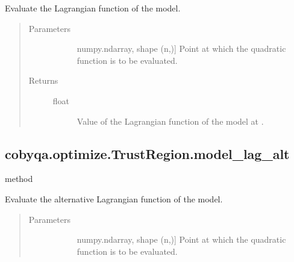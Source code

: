 \documentclass[letterpaper,10pt,english]{sphinxmanual}
\begin{document}
\begin{fulllineitems}
\begin{fulllineitems}
\label{\detokenize{refs/generated/cobyqa.optimize.TrustRegion.model_lag:cobyqa.optimize.TrustRegion.model_lag}}
\sphinxAtStartPar
Evaluate the Lagrangian function of the model.
\begin{quote}\begin{description}
\item[{Parameters}] \leavevmode\begin{description}
\item[{}] \leavevmode{[}numpy.ndarray, shape (n,){]}
\sphinxAtStartPar
Point at which the quadratic function is to be evaluated.

\end{description}

\item[{Returns}] \leavevmode\begin{description}
\item[{float}] \leavevmode
\sphinxAtStartPar
Value of the Lagrangian function of the model at .

\end{description}

\end{description}\end{quote}

\end{fulllineitems}



\subsection{cobyqa.optimize.TrustRegion.model\_lag\_alt}
\label{\detokenize{refs/generated/cobyqa.optimize.TrustRegion.model_lag_alt:cobyqa-optimize-trustregion-model-lag-alt}}\label{\detokenize{refs/generated/cobyqa.optimize.TrustRegion.model_lag_alt::doc}}
\sphinxAtStartPar
method

\begin{fulllineitems}
\label{\detokenize{refs/generated/cobyqa.optimize.TrustRegion.model_lag_alt:cobyqa.optimize.TrustRegion.model_lag_alt}}
\sphinxAtStartPar
Evaluate the alternative Lagrangian function of the model.
\begin{quote}\begin{description}
\item[{Parameters}] \leavevmode\begin{description}
\item[{}] \leavevmode{[}numpy.ndarray, shape (n,){]}
\sphinxAtStartPar
Point at which the quadratic function is to be evaluated.


\end{description}
\end{description}
\end{quote}
\end{fulllineitems}
\end{fulllineitems}
\end{document}
